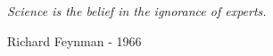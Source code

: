 \backmatter

\normalfont

\cleartooddpage

\pagestyle{empty}

\begin{table}[b!]
\begin{center}
\textit{Science is the belief in the ignorance of experts.}
\end{center}
\begin{flushright}
Richard Feynman - 1966\\
\end{flushright}
\end{table}